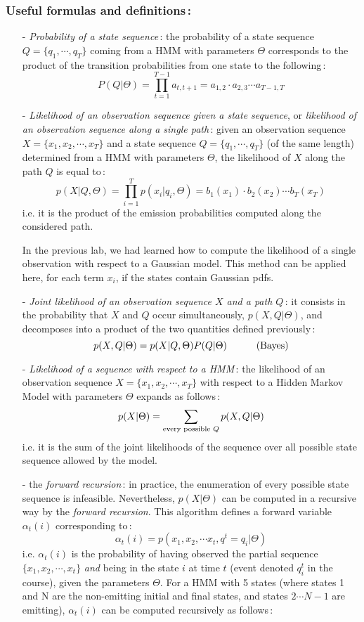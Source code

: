 \documentclass[twoside,a4paper,titlepage]{article}
\begin{document}
\subsubsection*{Useful formulas and definitions\,:}
\begin{itemize}
\item[-] {\em Probability of a state sequence}\,: the probability of a
state sequence $Q=\{q_1,\cdots,q_T\}$ coming from a HMM with parameters
$\Theta$ corresponds to the product of the transition probabilities from
one state to the following\,:
\[
P(Q|\Theta) = \prod_{t=1}^{T-1} a_{t,t+1}
= a_{1,2} \cdot a_{2,3} \cdots a_{T-1,T}
\]
%
\item[-] {\em Likelihood of an observation sequence given a state
sequence}, or {\em likelihood of an observation sequence along a single
path}\,: given an observation sequence $X=\{x_1,x_2,\cdots,x_T\}$ and a
state sequence $Q=\{q_1,\cdots,q_T\}$ (of the same length) determined from
a HMM with parameters $\Theta$, the likelihood of $X$ along the path $Q$ is
equal to\,:
\[
p(X|Q,\Theta) = \prod_{i=1}^T p(x_i|q_i,\Theta)
= b_1(x_1) \cdot b_2(x_2) \cdots b_T(x_T)
\]
i.e. it is the product of the emission probabilities computed along the
considered path.

In the previous lab, we had learned how to compute the likelihood of a
single observation with respect to a Gaussian model. This method can be
applied here, for each term $x_i$, if the states contain Gaussian pdfs.
%
\item[-] {\em Joint likelihood of an observation sequence $X$ and a path
$Q$}\,: it consists in the probability that $X$ and $Q$ occur
simultaneously, $p(X,Q|\Theta)$, and decomposes into a product of the two
quantities defined previously\,:
\[
p(X,Q|\Theta) = p(X|Q,\Theta) P(Q|\Theta) \mbox{\hspace{3em}(Bayes)}
\]
%
\item[-] {\em Likelihood of a sequence with respect to a HMM}\,: the
likelihood of an observation sequence $X=\{x_1,x_2,\cdots,x_T\}$ with
respect to a Hidden Markov Model with parameters $\Theta$ expands as
follows\,:
\[
	p(X|\Theta) = \sum_{\mbox{\scriptsize every possible }Q} p(X,Q|\Theta)
\]
i.e. it is the sum of the joint likelihoods of the sequence over all
possible state sequence allowed by the model.
%
\item[-] the {\em forward recursion}\,: in practice, the enumeration of
every possible state sequence is infeasible. Nevertheless, $p(X|\Theta)$
can be computed in a recursive way by the {\em forward recursion}. This
algorithm defines a forward variable $\alpha_t(i)$ corresponding to\,:
\[
	\alpha_t(i) = p(x_1,x_2,\cdots x_t,q^t=q_i|\Theta)
\]
i.e. $\alpha_t(i)$ is the probability of having observed the partial
sequence $\{x_1,x_2,\cdots,x_t\}$ {\em and} being in the state $i$ at time
$t$ (event denoted $q_i^t$ in the course), given the parameters
$\Theta$. For a HMM with 5 states (where states 1 and N are the
non-emitting initial and final states, and states $2 \cdots N-1$ are
emitting), $\alpha_t(i)$ can be computed recursively as follows\,:


\end{itemize}
\end{document}
